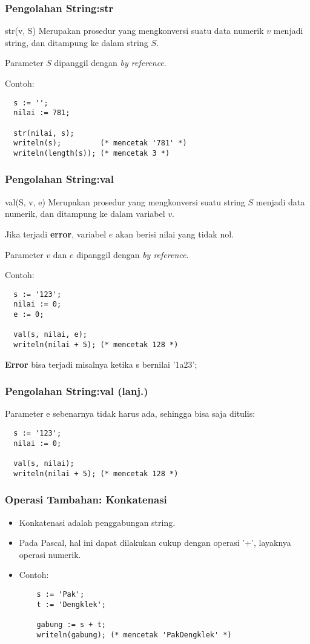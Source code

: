\begin{frame}[fragile]
\frametitle{Pengolahan String:\newline str}
\begin{block}{str(v, S)}
Merupakan prosedur yang mengkonversi suatu data numerik $v$ menjadi string, dan ditampung ke dalam string $S$.

Parameter $S$ dipanggil dengan \textit{by reference}.
\end{block}
Contoh:
\begin{lstlisting}
  s := '';
  nilai := 781;

  str(nilai, s);
  writeln(s);         (* mencetak '781' *)
  writeln(length(s)); (* mencetak 3 *)
\end{lstlisting}
\end{frame}

\begin{frame}[fragile]
\frametitle{Pengolahan String:\newline val}
\begin{block}{val(S, v, e)}
Merupakan prosedur yang mengkonversi suatu string $S$ menjadi data numerik, dan ditampung ke dalam variabel $v$.

Jika terjadi \textbf{error}, variabel $e$ akan berisi nilai yang tidak nol.

Parameter $v$ dan $e$ dipanggil dengan \textit{by reference}.
\end{block}
Contoh:
\begin{lstlisting}
  s := '123';
  nilai := 0;
  e := 0;

  val(s, nilai, e);
  writeln(nilai + 5); (* mencetak 128 *)
\end{lstlisting}

\textbf{Error} bisa terjadi misalnya ketika s bernilai '1a23';
\end{frame}

\begin{frame}[fragile]
\frametitle{Pengolahan String:\newline val (lanj.)}
Parameter e sebenarnya tidak harus ada, sehingga bisa saja ditulis:
\begin{lstlisting}
  s := '123';
  nilai := 0;

  val(s, nilai);
  writeln(nilai + 5); (* mencetak 128 *)
\end{lstlisting}
\end{frame}

\begin{frame}[fragile]
\frametitle{Operasi Tambahan: Konkatenasi}
\begin{itemize}
  \item Konkatenasi adalah penggabungan string.
  \item Pada Pascal, hal ini dapat dilakukan cukup dengan operasi '+', layaknya operasi numerik.
  \item Contoh:
  \begin{lstlisting}
    s := 'Pak';
    t := 'Dengklek';

    gabung := s + t;
    writeln(gabung); (* mencetak 'PakDengklek' *)
  \end{lstlisting}
\end{itemize}
\end{frame}


